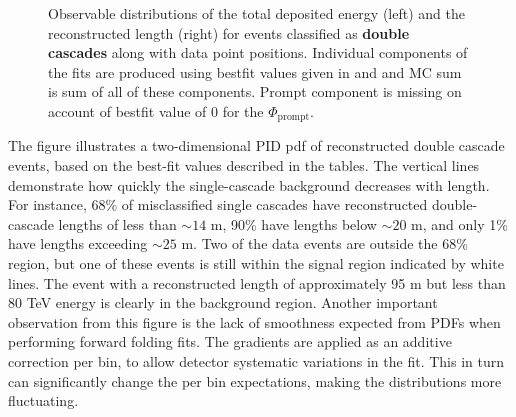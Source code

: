 \begin{figure}[h]
\begin{subfigure}[h]{0.7\textwidth}
    \end{subfigure}%
    \caption{Observable distributions of the total deposited energy (left) and the reconstructed length (right) for events classified as \textbf{double cascades} along with data point positions. Individual components of the fits are produced using bestfit values given in  and  and MC sum is sum of all of these components. Prompt component is missing on account of bestfit value of 0 for the $\Phi_{\mathrm{prompt}}$.}
\end{figure}
The figure  illustrates a two-dimensional PID pdf of reconstructed double cascade events, based on the best-fit values described in the tables. The vertical lines demonstrate how quickly the single-cascade background decreases with length. For instance, 68\% of misclassified single cascades have reconstructed double-cascade lengths of less than $\sim 14$ m, 90\% have lengths below $\sim  20$ m, and only 1\% have lengths exceeding $\sim 25$ m. Two of the data events are outside the 68\% region, but one of these events is still within the signal region indicated by white lines. The event with a reconstructed length of approximately 95 m but less than 80 TeV energy is clearly in the background region. Another important observation from this figure is the lack of smoothness expected from PDFs when performing forward folding fits. The gradients are applied as an additive correction per bin, to allow detector systematic variations in the fit. This in turn can significantly change the per bin expectations, making the distributions more fluctuating.
